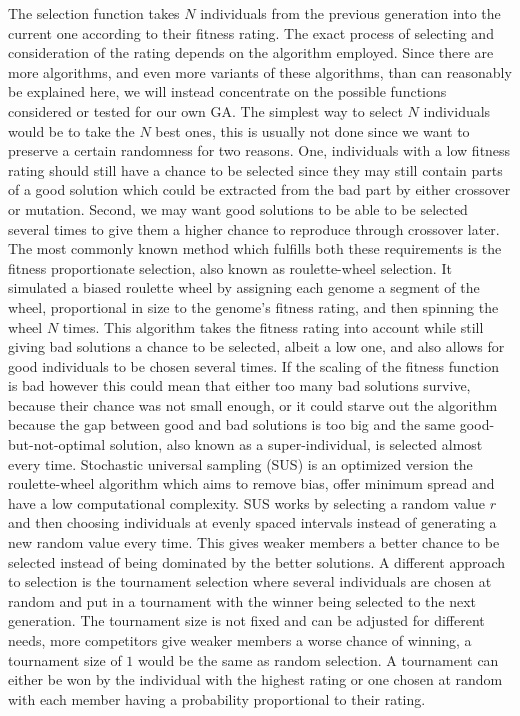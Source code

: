 The selection function takes $N$ individuals from the previous generation into the current one according to their fitness rating. The exact process of selecting and consideration of the rating depends on the algorithm employed. Since there are more algorithms, and even more variants of these algorithms, than can reasonably be explained here, we will instead concentrate on the possible functions considered or tested for our own GA. The simplest way to select $N$ individuals would be to take the $N$ best ones, this is usually not done since we want to preserve a certain randomness for two reasons. One, individuals with a low fitness rating should still have a chance to be selected since they may still contain parts of a good solution which could be extracted from the bad part by either crossover or mutation. Second, we may want good solutions to be able to be selected several times to give them a higher chance to reproduce through crossover later. The most commonly known method which fulfills both these requirements is the fitness proportionate selection\cite{16}, also known as roulette-wheel selection. It simulated a biased roulette wheel by assigning each genome a segment of the wheel, proportional in size to the genome's fitness rating, and then spinning the wheel $N$ times. This algorithm takes the fitness rating into account while still giving bad solutions a chance to be selected, albeit a low one, and also allows for good individuals to be chosen several times.  If the scaling of the fitness function is bad however this could mean that either too many bad solutions survive, because their chance was not small enough, or it could starve out the algorithm because the gap between good and bad solutions is too big and the same good-but-not-optimal solution, also known as a super-individual, is selected almost every time. Stochastic universal sampling (SUS) is an optimized version the roulette-wheel algorithm which aims to remove bias, offer minimum spread and have a low computational complexity. SUS works by selecting a random value $r$ and then choosing individuals at evenly spaced intervals instead of generating a new random value every time. This gives weaker members a better chance to be selected instead of being dominated by the better solutions.\cite{17} A different approach to selection is the tournament selection where several individuals are chosen at random and put in a tournament with the winner being selected to the next generation. The tournament size is not fixed and can be adjusted for different needs, more competitors give weaker members a worse chance of winning, a tournament size of $1$ would be the same as random selection. A tournament can either be won by the individual with the highest rating or one chosen at random with each member having a probability proportional to their rating.

